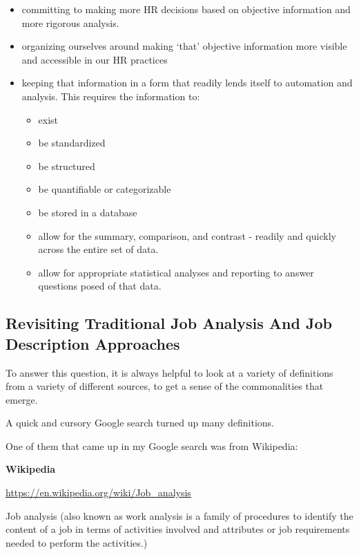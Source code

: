 \documentclass[12pt,letterpaper]{article}
\begin{document}
\begin{itemize}
\item
  committing to making more HR decisions based on objective information
  and more rigorous analysis.
\item
  organizing ourselves around making `that' objective information more
  visible and accessible in our HR practices
\item
  keeping that information in a form that readily lends itself to
  automation and analysis. This requires the information to:

  \begin{itemize}
  \item
    exist
  \item
    be standardized
  \item
    be structured
  \item
    be quantifiable or categorizable
  \item
    be stored in a database
  \item
    allow for the summary, comparison, and contrast - readily and quickly
    across the entire set of data.
  \item
    allow for appropriate statistical analyses and reporting to answer
    questions posed of that data.
  \end{itemize}
\end{itemize}

\subsection{Revisiting Traditional Job Analysis And Job Description
Approaches}

To answer this question, it is always helpful to look at a variety of
definitions from a variety of different sources, to get a sense of the
commonalities that emerge.


A quick and cursory Google search turned up many definitions.


One of them that came up in my Google search was from Wikipedia:

\textbf{Wikipedia}

\url{https://en.wikipedia.org/wiki/Job_analysis}

Job analysis (also known as work analysis is a
family of procedures to identify the content of a job in terms of
activities involved and attributes or job requirements needed to perform
the activities.)
\end{document}
